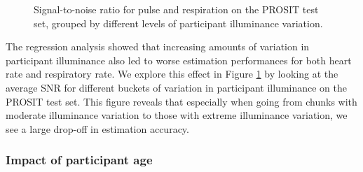 \documentclass{article}
\begin{document}
\begin{figure}[h!]
  \centering
  \caption{Signal-to-noise ratio for pulse and respiration on the PROSIT test set, grouped by different levels of participant illuminance variation.}
  \label{fig:impact-illuminance}
\end{figure}

The regression analysis showed that increasing amounts of variation in participant illuminance also led to worse estimation performances for both heart rate and respiratory rate.
We explore this effect in Figure \ref{fig:impact-illuminance} by looking at the average SNR for different buckets of variation in participant illuminance on the PROSIT test set.
This figure reveals that especially when going from chunks with moderate illuminance variation to those with extreme illuminance variation, we see a large drop-off in estimation accuracy.

\subsubsection{Impact of participant age}

\datatable
\end{document}
